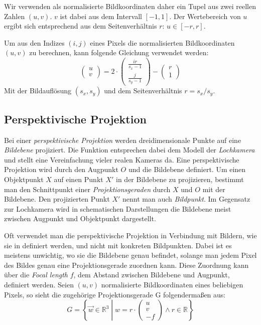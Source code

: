 \documentclass[ngerman,a4paper]{scrartcl}
\def \R{\mathbb{R}}
\begin{document}
Wir verwenden als normalisierte Bildkoordinaten daher ein Tupel aus zwei reellen Zahlen $(u,v)$. $v$ ist dabei aus dem Intervall $[-1,1]$. Der Wertebereich von $u$ ergibt sich entsprechend aus dem Seitenverhältnis $r$: $u \in [-r,r]$.

Um aus den Indizes $(i,j)$ eines Pixels die normalisierten Bildkoordinaten $(u,v)$ zu berechnen, kann folgende Gleichung verwendet werden:
\[ \begin{pmatrix}
u \\ v
\end{pmatrix} = 2 \cdot \begin{pmatrix}
\frac{i r}{s_x - 1} \\
\frac{j}{s_y - 1}
\end{pmatrix} - \begin{pmatrix}
r \\ 1
\end{pmatrix} \]
Mit der Bildauflösung $(s_x, s_y)$ und dem Seitenverhältnis $r = s_x/s_y$.

\subsection{Perspektivische Projektion}

Bei einer \emph{perspektivische Projektion} werden dreidimensionale Punkte auf eine \emph{Bildebene} projiziert. Die Funktion entsprechen dabei dem Modell der \emph{Lochkamera} und stellt eine Vereinfachung vieler realen Kameras da. Eine perspektivische Projektion wird durch den Augpunkt $O$ und die Bildebene definiert. Um einen Objektpunkt $X$ auf einen Punkt $X'$ in der Bildebene zu projizieren, bestimmt man den Schnittpunkt einer \emph{Projektionsgeraden} durch $X$ und $O$ mit der Bildebene. Den projizierten Punkt $X'$ nennt man auch \emph{Bildpunkt}. Im Gegensatz zur Lochkamera wird in schematischen Darstellungen die Bildebene meist zwischen Augpunkt und Objektpunkt dargestellt.

Oft verwendet man die perspektivische Projektion in Verbindung mit Bildern, wie sie in  definiert werden, und nicht mit konkreten Bildpunkten. Dabei ist es meistens unwichtig, wo sie die Bildebene genau befindet, solange man jedem Pixel des Bildes genau eine Projektionsgerade zuordnen kann. Diese Zuordnung kann über die \emph{Focal length} $f$, dem Abstand zwischen Bildebene und Augpunkt, definiert werden. Seien $(u,v)$ normalisierte Bildkoordinaten eines beliebigen Pixels, so sieht die zugehörige Projektionsgerade G folgendermaßen aus:
\[ G = \left\lbrace \vec{w} \in \R^3 \middle\vert w = r \cdot \begin{pmatrix}
u \\ v \\ -f
\end{pmatrix} \land r \in \R \right\rbrace \]
\end{document}
